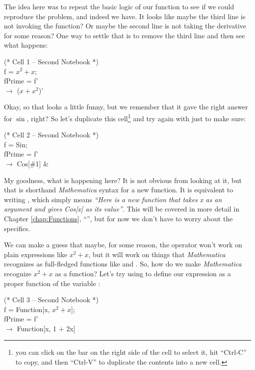 The idea here was to repeat the basic logic of our  function to see if we could reproduce the problem, and indeed we have. It looks like maybe the third line is not invoking the function? Or maybe the second line is not taking the derivative for some reason? One way to settle that is to remove the third line and then see what happens:

\begin{code}
	   (* Cell 1 -- Second Notebook *)\\
	   f = $x^2 + x$;\\
	   fPrime = f'\\
	   $\rightarrow$ ($x + x^2$)'
\end{code}

Okay, so that looks a little funny, but we remember that it gave the right answer for $\sin$, right? So let's duplicate this cell\footnote{you can click on the bar on the right side of the cell to select it, hit ``Ctrl-C'' to copy, and then ``Ctrl-V'' to duplicate the contents into a new cell.} and try again with  just to make sure:

\begin{code}
	   (* Cell 2 -- Second Notebook *)\\
	   f = Sin;\\
	   fPrime = f'\\
	   $\rightarrow$ Cos[\#1] \&
\end{code}

My goodness, what is happening here? It is not obvious from looking at it, but that is shorthand \emph{Mathematica} syntax for a new function. It is equivalent to writing , which simply means \emph{``Here is a new function that takes x as an argument and gives Cos[x] as its value''}. This will be covered in more detail in Chapter \ref{chap:Functions}, ``'', but for now we don't have to worry about the specifics. 

We can make a guess that maybe, for some reason, the  operator won't work on plain expressions like $x^2 + x$, but it will work on things that \emph{Mathematica} recognizes as full-fledged functions like  and . So, how do we make \emph{Mathematica} recognize $x^2 + x$ as a function? Let's try using  to define our expression as a proper function of the variable :

\begin{code}
	   (* Cell 3 -- Second Notebook *)\\
	   f = Function[x, $x^2 + x$];\\
	   fPrime = f'\\
	   $\rightarrow$ Function[x, 1 + 2x]
\end{code}

